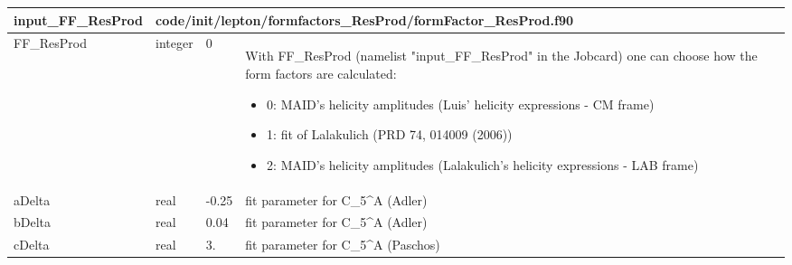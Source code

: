 \documentclass{article}
\begin{document}
\begin{longtable}{llll}
\toprule
\textbf{\large{input\_FF\_ResProd}} & \multicolumn{3}{l}{\footnotesize{code/init/lepton/formfactors\_ResProd/formFactor\_ResProd.f90}}\\*
\midrule
\endfirsthead
\midrule
\endhead
FF\_ResProd & \begin{minipage}[t]{2cm}integer\end{minipage} & \begin{minipage}[t]{2cm}0\end{minipage} & \begin{minipage}[t]{12cm}With FF\_ResProd (namelist "input\_FF\_ResProd" in the Jobcard) one can choose how the form factors are calculated:\begin{itemize}\leftmargin0em\itemindent0pt\item 0: MAID's helicity amplitudes (Luis' helicity expressions - CM frame)\item 1: fit of Lalakulich (PRD 74, 014009 (2006))\item 2: MAID's helicity amplitudes (Lalakulich's helicity expressions - LAB frame)\end{itemize}\end{minipage}\\*
\midrule
aDelta & \begin{minipage}[t]{2cm}real\end{minipage} & \begin{minipage}[t]{2cm}-0.25\end{minipage} & \begin{minipage}[t]{12cm}fit parameter for C\_5\^{}A (Adler)\end{minipage}\\*
\midrule
bDelta & \begin{minipage}[t]{2cm}real\end{minipage} & \begin{minipage}[t]{2cm}0.04\end{minipage} & \begin{minipage}[t]{12cm}fit parameter for C\_5\^{}A (Adler)\end{minipage}\\*
\midrule
cDelta & \begin{minipage}[t]{2cm}real\end{minipage} & \begin{minipage}[t]{2cm}3.\end{minipage} & \begin{minipage}[t]{12cm}fit parameter for C\_5\^{}A (Paschos)\end{minipage}\\*

\end{longtable}
\end{document}
